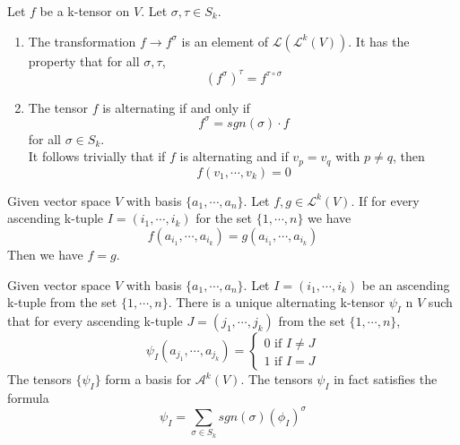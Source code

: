 \begin{lemma}
    Let $f$ be a k-tensor on $V$. Let $\sigma,\tau\in S_k$.
    \begin{enumerate}
        \item The transformation $f\longrightarrow f^{\sigma}$ is an element of $\mathcal{L}(\mathcal{L}^k(V))$. 
        It has the property that for all $\sigma,\tau$, $$(f^{\sigma})^{\tau}=f^{\tau\circ\sigma}$$
        \item The tensor $f$ is alternating if and only if $$f^{\sigma}=sgn(\sigma)\cdot f$$ for all $\sigma\in S_k$.\\
        It follows trivially that if $f$ is alternating and if $v_p=v_q$ with $p\neq q$, then $$f(v_1,\cdots,v_k)=0$$
    \end{enumerate}
\end{lemma}

\begin{lemma}
    Given vector space $V$ with basis $\{a_1,\cdots,a_n\}$. Let $f,g\in \mathcal{L}^k(V)$. If for every ascending k-tuple $I=(i_1,\cdots,i_k)$ for the set $\{1,\cdots,n\}$ we have $$f(a_{i_1},\cdots,a_{i_k})=g(a_{i_1},\cdots,a_{i_k})$$
    Then we have $f=g$.
\end{lemma}

\begin{theorem}
    Given vector space $V$ with basis $\{a_1,\cdots,a_n\}$. Let $I=(i_1,\cdots,i_k)$ be an ascending k-tuple from the set $\{1,\cdots,n\}$. There is a unique alternating k-tensor $\psi_I$ n $V$ such that for every ascending k-tuple $J=(j_1,\cdots,j_k)$ from the set $\{1,\cdots,n\}$, 
    \begin{equation*}
        \psi_I(a_{j_1},\cdots,a_{j_k})=\begin{cases}
            0 \text{ if }I\neq J\\
            1 \text{ if }I =J
        \end{cases}
    \end{equation*}
    The tensors $\{\psi_I\}$ form a basis for $\mathcal{A}^k(V)$. The tensors $\psi_I$ in fact satisfies the formula 
    $$\psi_I=\sum_{\sigma\in S_k}sgn(\sigma)(\phi_I)^{\sigma}$$
\end{theorem}

